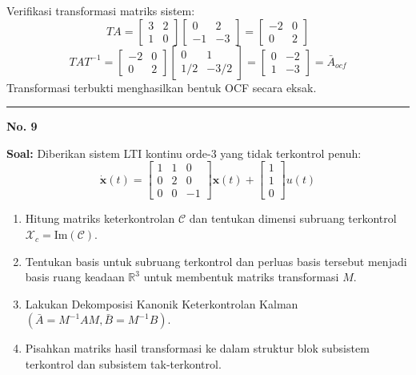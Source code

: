 \documentclass[11pt,a4paper]{article}
\begin{document}
Verifikasi transformasi matriks sistem:
$$T A = \begin{bmatrix} 3 & 2 \\ 1 & 0 \end{bmatrix} \begin{bmatrix} 0 & 2 \\ -1 & -3 \end{bmatrix} = \begin{bmatrix} -2 & 0 \\ 0 & 2 \end{bmatrix}$$
$$T A T^{-1} = \begin{bmatrix} -2 & 0 \\ 0 & 2 \end{bmatrix} \begin{bmatrix} 0 & 1 \\ 1/2 & -3/2 \end{bmatrix} = \begin{bmatrix} 0 & -2 \\ 1 & -3 \end{bmatrix} = \bar{A}_{ocf}$$
Transformasi terbukti menghasilkan bentuk OCF secara eksak.

\vspace{12pt}
\hrule
\vspace{10pt}

\textbf{\large No. 9}

\textbf{Soal:}  
Diberikan sistem LTI kontinu orde-3 yang tidak terkontrol penuh:
$$\dot{\mathbf{x}}(t) = \begin{bmatrix} 1 & 1 & 0 \\ 0 & 2 & 0 \\ 0 & 0 & -1 \end{bmatrix} \mathbf{x}(t) + \begin{bmatrix} 1 \\ 1 \\ 0 \end{bmatrix} u(t)$$
\begin{enumerate}[label=(\alph*)]
    \item Hitung matriks keterkontrolan $\mathcal{C}$ dan tentukan dimensi subruang terkontrol $\mathcal{X}_c = \text{Im}(\mathcal{C})$.
    \item Tentukan basis untuk subruang terkontrol dan perluas basis tersebut menjadi basis ruang keadaan $\mathbb{R}^3$ untuk membentuk matriks transformasi $M$.
    \item Lakukan Dekomposisi Kanonik Keterkontrolan Kalman $(\bar{A} = M^{-1} A M, \bar{B} = M^{-1} B)$.
    \item Pisahkan matriks hasil transformasi ke dalam struktur blok subsistem terkontrol dan subsistem tak-terkontrol.
\end{enumerate}
\end{document}

